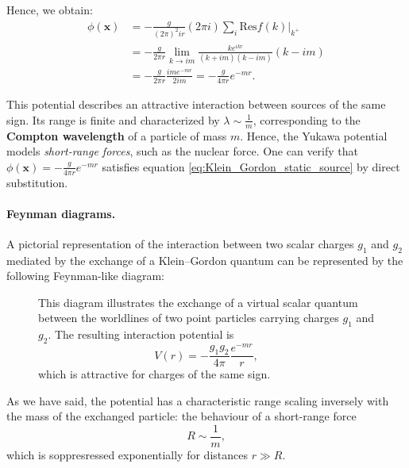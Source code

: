 Hence, we obtain:
\[
    \begin{aligned}
        \phi(\mathbf{x}) & = -\frac{g}{(2\pi)^2 ir} (2\pi i)\sum_{i} \mathrm{Res} f(k) \Big|_{k^+}  \\
                         & = -\frac{g}{2\pi r} \lim_{k \to im} \frac{k e^{ikr}}{(k+im)(k-im)}(k-im) \\
                         & = -\frac{g}{2\pi r} \frac{im e^{-mr}}{2im} = -\frac{g}{4\pi r} e^{-mr}.
    \end{aligned}
\]

This potential describes an attractive interaction between sources of the same sign. Its range is finite and characterized by \(\lambda \sim \tfrac{1}{m}\), corresponding to the \textbf{Compton wavelength} of a particle of mass $m$. Hence, the Yukawa potential models \textit{short-range forces}, such as the nuclear force.
One can verify that \(\phi(\mathbf{x}) = -\tfrac{g}{4\pi r} e^{-mr}\) satisfies equation \eqref{eq:Klein_Gordon_static_source} by direct substitution.

\paragraph{Feynman diagrams.} A pictorial representation of the interaction between two scalar charges $g_1$ and $g_2$ mediated by the exchange of a Klein–Gordon quantum can be represented by the following Feynman-like diagram:

\begin{figure}[H]
    \begin{minipage}{0.45\textwidth}
        \centering
    \end{minipage}
    \hfill
    \begin{minipage}{0.5\textwidth}
        This diagram illustrates the exchange of a virtual scalar quantum between the worldlines of two point particles carrying charges $g_1$ and $g_2$.
        The resulting interaction potential is
        \begin{equation}
            V(r) = -\frac{g_1 g_2}{4\pi} \frac{e^{-m r}}{r},
        \end{equation}
        which is attractive for charges of the same sign.
    \end{minipage}
\end{figure}
As we have said, the potential has a characteristic range scaling inversely with the mass of the exchanged particle: the behaviour of a short-range force
\[
    R \sim \frac{1}{m},
\]
which is soppresressed exponentially for distances \( r \gg R \).

